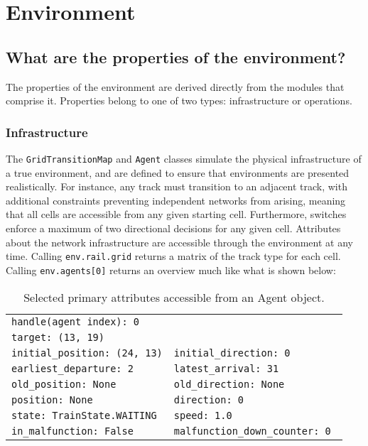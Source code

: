 \section{Environment}\label{sec:environment}

\subsection{What are the properties of the environment?}
The properties of the environment are derived directly from the modules that comprise it.  
Properties belong to one of two types: infrastructure or operations.

\subsubsection{Infrastructure}
The \texttt{GridTransitionMap} and \texttt{Agent} classes simulate the physical infrastructure of a true environment, and are defined to ensure that environments are presented realistically.  
For instance, any track must transition to an adjacent track, with additional constraints preventing independent networks from arising, meaning that all cells are accessible from any given starting cell.
Furthermore, switches enforce a maximum of two directional decisions for any given cell.
Attributes about the network infrastructure are accessible through the environment at any time.  
Calling \texttt{env.rail.grid} returns a matrix of the track type for each cell.  
Calling \texttt{env.agents[0]} returns an overview much like what is shown below:

\begin{table}[H]
\centering
	{\footnotesize
  	\begin{tabular}{@{\hspace*{1em}}ll@{}}
    	\toprule
	\texttt{handle(agent index): 0} \\
		\texttt{target: (13, 19)}  \\
		\texttt{initial\_position: (24, 13)} & 	\texttt{initial\_direction: 0}  \\
		\texttt{earliest\_departure: 2}  &	\texttt{latest\_arrival: 31}  \\
		\texttt{old\_position: None} 	&	\texttt{old\_direction: None}  \\
		\texttt{position: None}  	&	\texttt{direction: 0}   \\
		\texttt{state: TrainState.WAITING} & \texttt{speed: 1.0}	    \\             
		\texttt{in\_malfunction: False} & \texttt{malfunction\_down\_counter: 0 }      \\     
	\bottomrule
	\end{tabular}
	\caption{Selected primary attributes accessible from an Agent object.}
	}
\end{table} 

